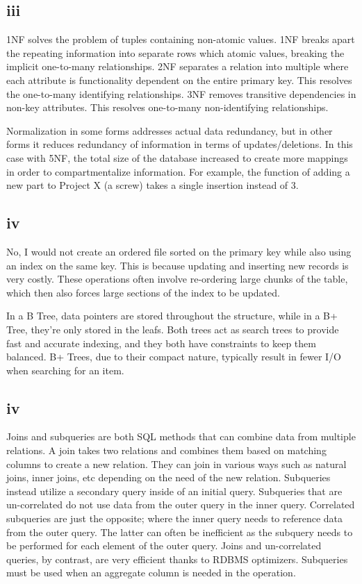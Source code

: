 \documentclass[a4paper,11pt]{article}
\begin{document}
\subsection*{iii}
1NF solves the problem of tuples containing non-atomic values.  1NF breaks apart the repeating information into separate rows which atomic values, breaking the implicit one-to-many relationships.  2NF separates a relation into multiple where each attribute is functionality dependent on the entire primary key.   This resolves the one-to-many identifying relationships.  3NF removes transitive dependencies in non-key attributes.  This resolves one-to-many non-identifying relationships.

Normalization in some forms addresses actual data redundancy, but in other forms it reduces redundancy of information in terms of updates/deletions.  In this case with 5NF, the total size of the database increased to create more mappings in order to compartmentalize information.  For example, the function of adding a new part to Project X (a screw) takes a single insertion instead of 3.  

\subsection*{iv}
No, I would not create an ordered file sorted on the primary key while also using an index on the same key.  This is because updating and inserting new records is very costly.  These operations often involve re-ordering large chunks of the table, which then also forces large sections of the index to be updated. 

In a B Tree, data pointers are stored throughout the structure, while in a B+ Tree, they're only stored in the leafs.  Both trees act as search trees to provide fast and accurate indexing, and they both have constraints to keep them balanced.   B+ Trees, due to their compact nature, typically result in fewer I/O when searching for an item.

\subsection*{iv}
Joins and subqueries are both SQL methods that can combine data from multiple relations.  A join takes two relations and combines them based on matching columns to create a new relation.  They can join in various ways such as natural joins, inner joins, etc depending on the need of the new relation.  Subqueries instead utilize a secondary query inside of an initial query.  Subqueries that are un-correlated do not use data from the outer query in the inner query.  Correlated subqueries are just the opposite; where the inner query needs to reference data from the outer query.   The latter can often be inefficient as the subquery needs to be performed for each element of the outer query.  Joins and un-correlated queries, by contrast, are very efficient thanks to RDBMS optimizers.  Subqueries must be used when an aggregate column is needed in the operation.
\end{document}
